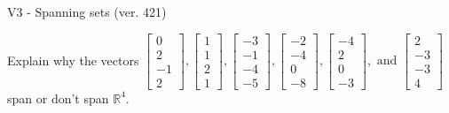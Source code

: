 \begin{exercise}
  \begin{exerciseTitle}V3 - Spanning sets (ver. 421)\end{exerciseTitle}
  \begin{exerciseStatement}
    Explain why the vectors \(\left[\begin{array}{r}
0 \\
2 \\
-1 \\
2
\end{array}\right] , \left[\begin{array}{r}
1 \\
1 \\
2 \\
1
\end{array}\right] , \left[\begin{array}{r}
-3 \\
-1 \\
-4 \\
-5
\end{array}\right] , \left[\begin{array}{r}
-2 \\
-4 \\
0 \\
-8
\end{array}\right] , \left[\begin{array}{r}
-4 \\
2 \\
0 \\
-3
\end{array}\right] , \text{ and } \left[\begin{array}{r}
2 \\
-3 \\
-3 \\
4
\end{array}\right]\) span or don't span \(\mathbb{R}^4\). 
	



\end{exerciseStatement}
\end{exercise}
